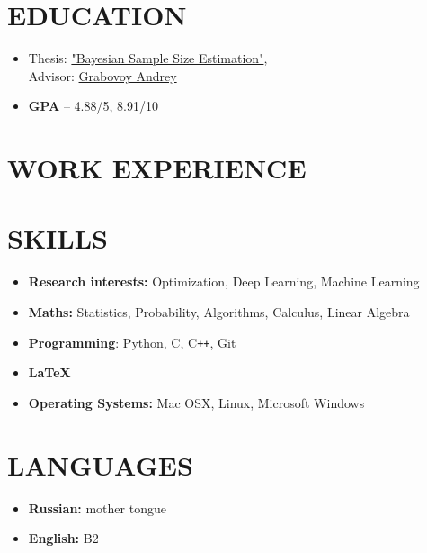 \documentclass[12pt]{moderncv}
\begin{document}
    \makecvtitle

    \section{EDUCATION}

        \begin{itemize}
            \item Thesis: \href{https://github.com/intsystems/Kiselev-BS-Thesis}{"Bayesian Sample Size Estimation"},\\
            Advisor: \href{https://andriygav.github.io}{Grabovoy Andrey}
            \item \textbf{GPA} -- 4.88/5, 8.91/10
        \end{itemize}

    \section{WORK EXPERIENCE}


    \section{SKILLS}
    
        \begin{itemize}
            \item \textbf{Research interests:} Optimization, Deep Learning, Machine Learning
            \item \textbf{Maths:} Statistics, Probability, Algorithms, Calculus, Linear Algebra
            \item \textbf{Programming}: Python, C, C\texttt{++}, Git
            \item \textbf{\LaTeX}
            \item \textbf{Operating Systems:} Mac OSX, Linux, Microsoft Windows
        \end{itemize}

    \section{LANGUAGES}

        \begin{itemize}
            \item \textbf{Russian:} mother tongue
            \item \textbf{English:} B2
        \end{itemize}
\end{document}
